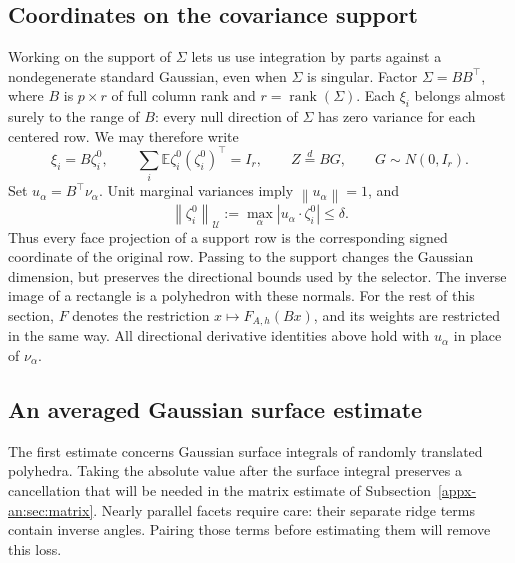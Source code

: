 \documentclass[11pt,letterpaper]{article}
\theoremstyle{remark}
\newcommand{\E}{\mathbb E}
\newcommand{\norm}[1]{\left\lVert#1\right\rVert}
\begin{document}
\subsection{Coordinates on the covariance support}

Working on the support of \(\Sigma\) lets us use integration by parts
against a nondegenerate standard Gaussian, even when \(\Sigma\) is
singular.
Factor \(\Sigma=BB^\top\), where \(B\) is \(p\times r\) of full
column rank and \(r=\operatorname{rank}(\Sigma)\).
Each \(\xi_i\) belongs almost surely to the range of \(B\): every
null direction of \(\Sigma\) has zero variance for each centered row.
We may therefore write
\begin{equation}
 \xi_i=B\zeta_i^0,\qquad
 \sum_i\E \zeta_i^0(\zeta_i^0)^\top=I_r,\qquad Z\stackrel d=BG,
 \qquad G\sim N(0,I_r).
 \label{appx-eq:support}
\end{equation}
Set \(u_\alpha=B^\top\nu_\alpha\). Unit marginal variances imply
\(\norm{u_\alpha}=1\), and
\begin{equation}
 \norm{\zeta_i^0}_{\mathcal U}
 :=\max_\alpha|u_\alpha\cdot \zeta_i^0|\le\delta.
 \label{appx-eq:projected-bound}
\end{equation}
Thus every face projection of a support row is the corresponding signed
coordinate of the original row. Passing to the support changes the Gaussian
dimension, but preserves the directional bounds used by the selector.
The inverse image of a rectangle is a polyhedron with these normals.
For the rest of this section, \(F\) denotes the restriction
\(x\mapsto F_{A,h}(Bx)\), and its weights are restricted in the same way.
All directional derivative identities above hold with \(u_\alpha\)
in place of \(\nu_\alpha\).



\subsection{An averaged Gaussian surface estimate}
\label{appx-an:sec:surface}

The first estimate concerns Gaussian surface integrals of randomly
translated polyhedra.  Taking the absolute value after the surface
integral preserves a cancellation that will be needed in the matrix
estimate of Subsection~\ref{appx-an:sec:matrix}. Nearly parallel facets
require care: their separate ridge terms contain inverse angles. Pairing
those terms before estimating them will remove this loss.
\end{document}
